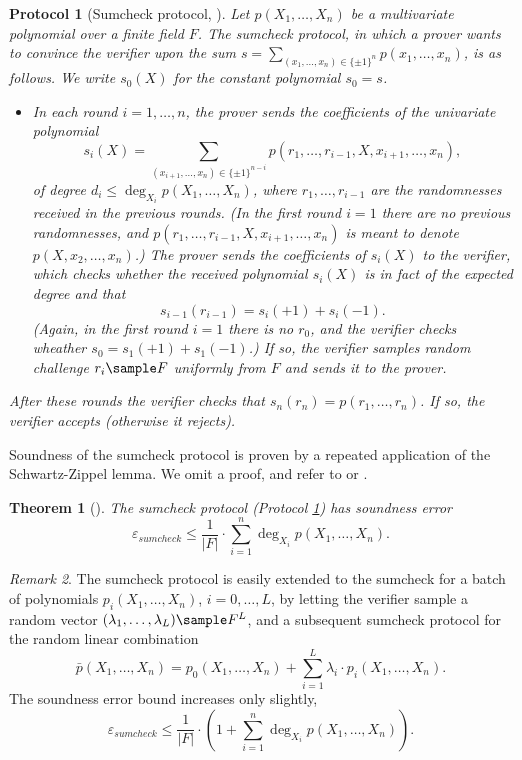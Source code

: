 \documentclass[11pt]{article}
\newtheorem{thm}{Theorem}[]
\newtheorem{protocol}[]{Protocol}
\theoremstyle{definition}
\theoremstyle{remark}
\newtheorem{rem}[thm]{Remark}
\begin{document}
\begin{protocol}[Sumcheck protocol, \cite{sumcheck}]
\label{p:Sumcheck}
Let $p(X_1,\ldots, X_n)$ be a multivariate polynomial over a finite field $F$. %
The sumcheck protocol, in which a prover wants to convince the verifier upon the sum $s = \sum_{(x_1,\ldots, x_n) \in \{\pm 1\}^n} p(x_1, \ldots, x_n)$, is as follows.
We write $s_0(X)$ for the constant polynomial $s_0 =s$.
\begin{itemize}
\item
In each round $i=1,\ldots, n$, the prover sends the coefficients of the univariate polynomial 
\[
s_i(X) = \sum_{(x_{i+1},\ldots, x_n) \in \{\pm 1\}^{n-i}} p(r_1,\ldots, r_{i-1},X ,x_{i+1}, \ldots, x_n),
\]
of degree $d_i \leq \deg_{X_i} p(X_1,\ldots, X_n)$, where $r_1, \ldots, r_{i-1}$ are the randomnesses received in the previous rounds. (In the first round $i=1$ there are no previous randomnesses, and $p(r_1,\ldots, r_{i-1},X ,x_{i+1}, \ldots, x_n)$ is meant to denote $p(X,x_2,\ldots, x_n)$.)
The prover sends the coefficients of $s_{i}(X)$ to the verifier, which checks whether the received polynomial $s_i(X)$ is in fact of the expected degree and that
\[
s_{i-1}(r_{i-1}) = s_{i}(+1) + s_{i}(-1).
\] 
(Again, in the first round $i=1$ there is no $r_0$, and the verifier checks wheather $s_0 = s_1(+1) + s_1(-1)$.) 
If so, the verifier samples random challenge $r_i\sample F$ uniformly from $F$ and sends it to the prover.
\end{itemize}
After these rounds the verifier checks that $s_n(r_n) = p(r_1,\ldots, r_n)$. 
If so, the verifier accepts (otherwise it rejects).  
\end{protocol}


Soundness of the sumcheck protocol is proven by a repeated application of the Schwartz-Zippel lemma. 
We omit a proof, and refer to \cite{sumcheck} or \cite{SumcheckThaler}. 
\begin{thm}[\cite{sumcheck}]
The sumcheck protocol (Protocol \ref{p:Sumcheck}) has soundness error
\begin{equation}
\label{e:SumcheckSoundness}
\varepsilon_{sumcheck} \leq \frac{1}{|F|}\cdot \sum_{i=1}^n \deg_{X_i} p(X_1,\ldots, X_n).
\end{equation}
\end{thm}
\begin{rem}
\label{rem:BatchedSumcheck}
The sumcheck protocol is easily extended to the sumcheck for a batch of polynomials $p_i(X_1,\ldots, X_n)$, $i=0, \ldots, L$, by letting the verifier sample a random vector $(\lambda_1,\ldots, \lambda_L)\sample F^L$, and a subsequent sumcheck protocol for the random linear combination
\[
\bar p (X_1, \ldots, X_n) = p_0(X_1,\ldots, X_n) + \sum_{i=1}^{L} \lambda_i \cdot p_i(X_1,\ldots, X_n).
\]
The soundness error bound increases only slightly,
\begin{equation}
\label{e:BatchSumcheckSoundness}
\varepsilon_{sumcheck} \leq \frac{1}{|F|}\cdot \left(1 + \sum_{i=1}^n \deg_{X_i} p(X_1,\ldots, X_n)\right).
\end{equation}
\end{rem}
\end{document}
